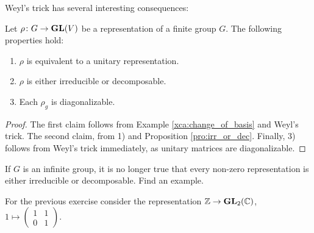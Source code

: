 \label{rho_diagonalizable}
Weyl's trick has several interesting consequences:  

\begin{corollary}
\label{cor:consequences}
	Let $\rho\colon G\to\mathbf{GL}(V)$ be a representation of a finite group $G$. 
 The following properties
	hold:
	\begin{enumerate}
		\item $\rho$ is equivalent to a unitary representation.
		\item $\rho$ is either irreducible or decomposable.
		\item Each $\rho_g$ is diagonalizable. 
	\end{enumerate}
\end{corollary}

\begin{proof}
	The first claim follows from Example \ref{xca:change_of_basis} and 
	Weyl's trick. The second claim, from 1) and
	Proposition \ref{pro:irr_or_dec}. Finally, 3) follows 
	from Weyl's trick immediately, as unitary matrices are diagonalizable.  
\end{proof}

\begin{exercise}
\label{xca:not_decomposable}
    If $G$ is an infinite group, it is no longer true that every non-zero representation
    is either irreducible or decomposable. Find an example.
\end{exercise}

For the previous exercise consider the representation $\mathbb{Z}\to\mathbf{GL}_2(\mathbb{C})$, 
$1\mapsto\begin{pmatrix}1&1\\0&1\end{pmatrix}$. 